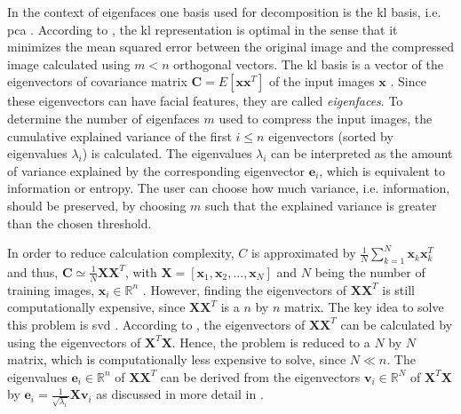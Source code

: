 In the context of eigenfaces one basis used for decomposition is the \ac{kl} basis, i.e. \ac{pca} \cite{eigenfaces1997}.
According to \citeauthor{eigenfaces1997}, the \ac{kl} representation is optimal in the sense that it minimizes the mean squared error between the original image and 
the compressed image calculated using $m < n$ orthogonal vectors.
The \ac{kl} basis is a vector of the eigenvectors of covariance matrix $\textbf{C} = E\left[ \textbf{x}\textbf{x}^{T} \right]$ of the input images $\mathbf{x}$ \cite{eigenfaces1997}.
Since these eigenvectors can have facial features, they are called \textit{eigenfaces}.
To determine the number of eigenfaces $m$ used to compress the input images, the cumulative explained variance of the first $i \le n$ eigenvectors (sorted by eigenvalues $\lambda_i$) is calculated.
The eigenvalues $\lambda_i$ can be interpreted as the amount of variance explained by the corresponding eigenvector $\textbf{e}_i$, which is equivalent to information or entropy.
The user can choose how much variance, i.e. information, should be preserved, by choosing $m$ such that the explained variance is greater than the chosen threshold.

In order to reduce calculation complexity, $C$ is approximated by $\frac{1}{N}\sum_{k=1}^{N}\textbf{x}_{k}\textbf{x}_{k}^{T}$ and thus, $\textbf{C} \simeq \frac{1}{N}\textbf{X}\textbf{X}^{T}$, 
with $\textbf{X} = \left[ \textbf{x}_{1}, \textbf{x}_{2}, ..., \textbf{x}_{N} \right]$ and $N$ being the number of training images, $\textbf{x}_i \in \mathbb{R}^{n}$ \cite{eigenfaces1997}.
However, finding the eigenvectors of $\textbf{X}\textbf{X}^{T}$ is still computationally expensive, since $\textbf{X}\textbf{X}^{T}$ is a $n$ by $n$ matrix.
The key idea to solve this problem is \ac{svd} \cite{eigenfaces1997}.
According to \citeauthor{eigenfaces1997}, the eigenvectors of $\textbf{X}\textbf{X}^{T}$ can be calculated by using the eigenvectors of $\textbf{X}^{T}\textbf{X}$.
Hence, the problem is reduced to a $N$ by $N$ matrix, which is computationally less expensive to solve, since $N \ll n$.
The eigenvalues $\textbf{e}_i \in \mathbb{R}^{n}$ of $\textbf{X}\textbf{X}^{T}$ can be derived from the eigenvectors $\textbf{v}_i \in \mathbb{R}^{N}$ of $\textbf{X}^{T}\textbf{X}$ by 
$\textbf{e}_i = \frac{1}{\sqrt{\lambda_i}}\textbf{X}\textbf{v}_i$ as discussed in more detail in \cite{eigenfaces1997}.


\cite{face-recognition2020}
\cite{face-recognition2021}
\cite{face-recognition2008}
\cite{eigenfaces2013}
\cite{eigenfaces1997}
\cite{eigenfaces1991}


